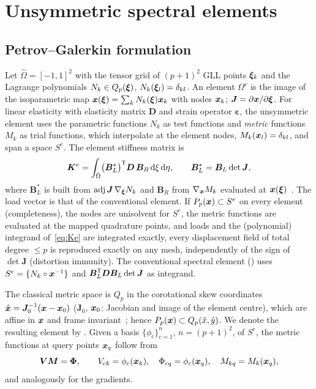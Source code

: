 \section{Unsymmetric spectral elements}\label{sec:formulation}
\subsection{Petrov--Galerkin formulation}
Let $\hat\Omega=[-1,1]^2$ with the tensor grid of $(p+1)^2$ GLL points $\bm{\xi}_k$ and the
Lagrange polynomials $N_k\in Q_p(\bm{\xi})$, $N_k(\bm{\xi}_l)=\delta_{kl}$. An element $\Omega^e$ is
the image of the isoparametric map $\bm{x}(\bm{\xi})=\sum_kN_k(\bm{\xi})\bm{x}_k$ with nodes $\bm{x}_k$; $\bm
J=\partial\bm{x}/\partial\bm{\xi}$. For linear elasticity with elasticity matrix $\bm D$ and strain
operator $\bm\varepsilon$, the unsymmetric element uses the parametric functions $N_k$ as test
functions and \emph{metric} functions $M_k$ as trial functions, which interpolate at the
element nodes, $M_k(\bm{x}_l)=\delta_{kl}$, and span a space $S^e$. The element stiffness
matrix is
\begin{equation}
  \bm K^e=\int_{\hat\Omega}\bigl(\bm B_L^\ast\bigr)^{\mathsf{T}}\bm D\,\bm B_R\,\mathrm{d}\xi\,\mathrm{d}\eta ,
  \qquad \bm B_L^\ast=\bm B_L\det\bm J ,
  \label{eq:Ke}
\end{equation}
where $\bm B_L^\ast$ is built from $\operatorname{adj}\bm J\,\nabla_{\bm{\xi}}N_k$ and $\bm B_R$
from $\nabla_{\bm{x}}M_k$ evaluated at $\bm{x}(\bm{\xi})$~\cite{Rajendran2010technique}. The load vector
is that of the conventional element. If $P_p(\bm{x})\subset S^e$ on every element (completeness),
the nodes are unisolvent for $S^e$, the metric functions are evaluated at the mapped quadrature
points, and loads and the (polynomial) integrand of~\eqref{eq:Ke} are integrated exactly, every
displacement field of total degree $\le p$ is reproduced exactly on any mesh, independently of the
sign of $\det\bm J$ (distortion immunity). The conventional spectral element (\PP) uses $S^e=\{N_k\circ
\bm{x}^{-1}\}$ and $\bm B_L^{\mathsf{T}}\bm D\bm B_L\det\bm J$ as integrand.

The classical metric space is $Q_p$ in the corotational skew coordinates $\hat{\bm{x}}=\bm
J_0^{-1}(\bm{x}-\bm{x}_0)$ ($\bm J_0$, $\bm{x}_0$: Jacobian and image of the element centre), which are
affine in $\bm{x}$ and frame invariant~\cite{Xie2016Modified}; hence $P_p(\bm{x})\subset Q_p(\hat
x,\hat y)$. We denote the resulting element by \PM. Given a basis $\{\phi_c\}_{c=1}^{n}$,
$n=(p+1)^2$, of $S^e$, the metric functions at query points $\bm{x}_q$ follow from
\begin{equation}
  \bm V\bm M=\bm\Phi ,\qquad V_{ck}=\phi_c(\bm{x}_k),\quad \Phi_{cq}=\phi_c(\bm{x}_q),\quad
  M_{kq}=M_k(\bm{x}_q),
  \label{eq:vandermonde}
\end{equation}
and analogously for the gradients.

